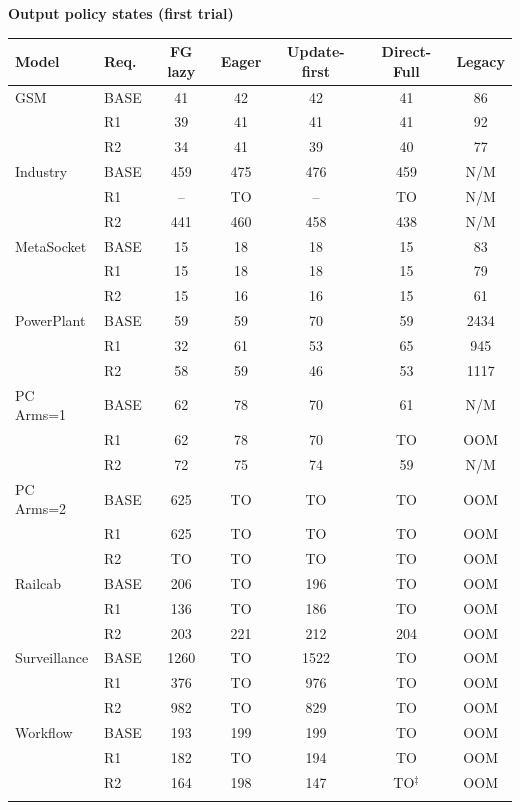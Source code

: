 \clearpage\noindent\textbf{Output policy states (first trial)}\par\smallskip
\begingroup\scriptsize\setlength{\tabcolsep}{3pt}
\begin{tabular}{@{}llccccc@{}}
\toprule
Model & Req. & FG lazy & Eager & Update-first & Direct-Full & Legacy\\
\midrule
GSM & BASE & 41 & 42 & 42 & 41 & 86\\
 & R1 & 39 & 41 & 41 & 41 & 92\\
 & R2 & 34 & 41 & 39 & 40 & 77\\
\addlinespace[2pt]
Industry & BASE & 459 & 475 & 476 & 459 & N/M\\
 & R1 & -- & TO & -- & TO & N/M\\
 & R2 & 441 & 460 & 458 & 438 & N/M\\
\addlinespace[2pt]
MetaSocket & BASE & 15 & 18 & 18 & 15 & 83\\
 & R1 & 15 & 18 & 18 & 15 & 79\\
 & R2 & 15 & 16 & 16 & 15 & 61\\
\addlinespace[2pt]
PowerPlant & BASE & 59 & 59 & 70 & 59 & 2434\\
 & R1 & 32 & 61 & 53 & 65 & 945\\
 & R2 & 58 & 59 & 46 & 53 & 1117\\
\addlinespace[2pt]
PC Arms=1 & BASE & 62 & 78 & 70 & 61 & N/M\\
 & R1 & 62 & 78 & 70 & TO & OOM\\
 & R2 & 72 & 75 & 74 & 59 & N/M\\
\addlinespace[2pt]
PC Arms=2 & BASE & 625 & TO & TO & TO & OOM\\
 & R1 & 625 & TO & TO & TO & OOM\\
 & R2 & TO & TO & TO & TO & OOM\\
\addlinespace[2pt]
Railcab & BASE & 206 & TO & 196 & TO & OOM\\
 & R1 & 136 & TO & 186 & TO & OOM\\
 & R2 & 203 & 221 & 212 & 204 & OOM\\
\addlinespace[2pt]
Surveillance & BASE & 1260 & TO & 1522 & TO & OOM\\
 & R1 & 376 & TO & 976 & TO & OOM\\
 & R2 & 982 & TO & 829 & TO & OOM\\
\addlinespace[2pt]
Workflow & BASE & 193 & 199 & 199 & TO & OOM\\
 & R1 & 182 & TO & 194 & TO & OOM\\
 & R2 & 164 & 198 & 147 & TO$^{\ddagger}$ & OOM\\
\addlinespace[2pt]
\bottomrule
\end{tabular}\endgroup

